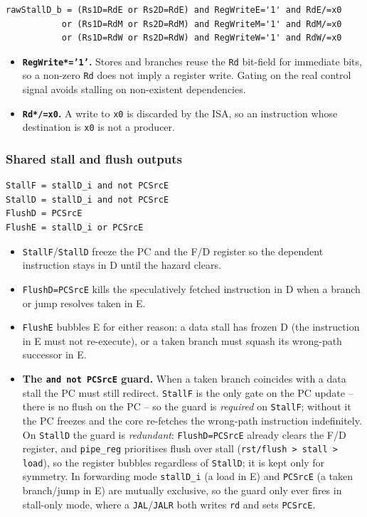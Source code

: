 \begin{lstlisting}[style=minrv]
rawStallD_b = (Rs1D=RdE or Rs2D=RdE) and RegWriteE='1' and RdE/=x0
           or (Rs1D=RdM or Rs2D=RdM) and RegWriteM='1' and RdM/=x0
           or (Rs1D=RdW or Rs2D=RdW) and RegWriteW='1' and RdW/=x0
\end{lstlisting}

\begin{itemize}[leftmargin=*]
  \item \textbf{\texttt{RegWrite*='1'}.} Stores and branches reuse the \texttt{Rd}
  bit-field for immediate bits, so a non-zero \texttt{Rd} does not imply a
  register write. Gating on the real control signal avoids stalling on
  non-existent dependencies.
  \item \textbf{\texttt{Rd*/=x0}.} A write to \texttt{x0} is discarded by the
  ISA, so an instruction whose destination is \texttt{x0} is not a producer.
\end{itemize}

\subsubsection{Shared stall and flush outputs}
\begin{lstlisting}[style=minrv]
StallF = stallD_i and not PCSrcE
StallD = stallD_i and not PCSrcE
FlushD = PCSrcE
FlushE = stallD_i or PCSrcE
\end{lstlisting}

\begin{itemize}[leftmargin=*]
  \item \texttt{StallF}/\texttt{StallD} freeze the PC and the F/D register so the
  dependent instruction stays in D until the hazard clears.
  \item \texttt{FlushD=PCSrcE} kills the speculatively fetched instruction in D
  when a branch or jump resolves taken in E.
  \item \texttt{FlushE} bubbles E for either reason: a data stall has frozen D
  (the instruction in E must not re-execute), or a taken branch must squash its
  wrong-path successor in E.
  \item \textbf{The \texttt{and not PCSrcE} guard.} When a taken branch coincides
  with a data stall the PC must still redirect. \texttt{StallF} is the only gate
  on the PC update -- there is no flush on the PC -- so the guard is
  \emph{required} on \texttt{StallF}; without it the PC freezes and the core
  re-fetches the wrong-path instruction indefinitely. On \texttt{StallD} the
  guard is \emph{redundant}: \texttt{FlushD=PCSrcE} already clears the F/D
  register, and \texttt{pipe\_reg} prioritises flush over stall
  (\texttt{rst/flush > stall > load}), so the register bubbles regardless of
  \texttt{StallD}; it is kept only for symmetry. In forwarding mode
  \texttt{stallD\_i} (a load in E) and \texttt{PCSrcE} (a taken branch/jump in E)
  are mutually exclusive, so the guard only ever fires in stall-only mode, where
  a \texttt{JAL}/\texttt{JALR} both writes \texttt{rd} and sets \texttt{PCSrcE}.
\end{itemize}
